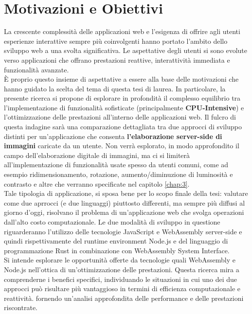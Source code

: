 \section{Motivazioni e Obiettivi}
\label{sec:Obiettivi}
La crescente complessità delle applicazioni web e l'esigenza di offrire agli utenti esperienze interattive sempre più coinvolgenti hanno portato l'ambito dello sviluppo web a una svolta significativa. Le aspettative degli utenti si sono evolute verso applicazioni che offrano prestazioni reattive, interattività immediata e funzionalità avanzate.
\\È proprio questo insieme di aspettative a essere alla base delle motivazioni che hanno guidato la scelta del tema di questa tesi di laurea.
In particolare, la presente ricerca si propone di esplorare in profondità il complesso equilibrio tra l'implementazione di funzionalità sofisticate (principalmente \textbf{CPU-Intensive}) e l'ottimizzazione delle prestazioni all'interno delle applicazioni web. Il fulcro di questa indagine sarà una comparazione dettagliata tra due approcci di sviluppo distinti per un'applicazione che consenta \textbf{l'elaborazione server-side di immagini} caricate da un utente.
Non verrà esplorato, in modo approfondito il campo dell'elaborazione digitale di immagini, ma ci si limiterà all'implementazione di funzionalità usate spesso da utenti comuni, come ad esempio ridimensionamento, rotazione, aumento/diminuzione di luminosità e contrasto e altre che verranno specificate nel capitolo \ref{chap:3}.
\\Tale tipologia di applicazione, si sposa bene per lo scopo finale della tesi: valutare come due aprrocci (e due linguaggi) piuttosto differenti, ma sempre più diffusi al giorno d'oggi, risolvano il problema di un'applicazione web che svolga operazioni dall'alto costo computazionale.
Le due modalità di sviluppo in questione riguarderanno l'utilizzo delle tecnologie JavaScript e WebAssembly server-side e quindi rispettivamente del runtime environment Node.js e del linguaggio di programmazione Rust in combinazione con WebAssembly System Interface. 
\\Si intende esplorare le opportunità offerte da tecnologie quali WebAssembly e Node.js nell'ottica di un'ottimizzazione delle prestazioni. Questa ricerca mira a comprenderne i benefici specifici, individuando le situazioni in cui uno dei due approcci può risultare più vantaggioso in termini di efficienza computazionale e reattività.
fornendo un'analisi approfondita delle performance e delle prestazioni riscontrate.
